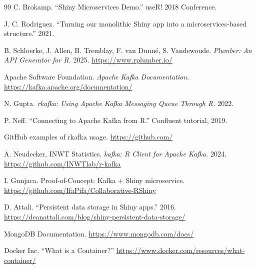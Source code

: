 \documentclass[12pt,a4paper]{article}
\begin{document}
\begin{thebibliography}{99}
 C. Brokamp. ``Shiny Microservices Demo.'' useR! 2018 Conference.

 J. C. Rodriguez. ``Turning our monolithic Shiny app into a microservices-based structure.'' 2021.

 B. Schloerke, J. Allen, B. Tremblay, F. van Dunn\'{e}, S. Vandewoude. \textit{Plumber: An API Generator for R.} 2025. \url{https://www.rplumber.io/}

 Apache Software Foundation. \textit{Apache Kafka Documentation.} \url{https://kafka.apache.org/documentation/}

 N. Gupta. \textit{rkafka: Using Apache Kafka Messaging Queue Through R.} 2022.

 P. Neff. ``Connecting to Apache Kafka from R.'' Confluent tutorial, 2019.

 GitHub examples of rkafka usage. \url{https://github.com/}

 A. Neudecker, INWT Statistics. \textit{kafka: R Client for Apache Kafka.} 2024. \url{https://github.com/INWTlab/r-kafka}

 I. Gunjaca. Proof-of-Concept: Kafka + Shiny microservice. \url{https://github.com/IfaPifa/Collaborative-RShiny}

 D. Attali. ``Persistent data storage in Shiny apps.'' 2016. \url{https://deanattali.com/blog/shiny-persistent-data-storage/}

 MongoDB Documentation. \url{https://www.mongodb.com/docs/}

 Docker Inc. ``What is a Container?'' \url{https://www.docker.com/resources/what-container/}

\end{thebibliography}
\end{document}
